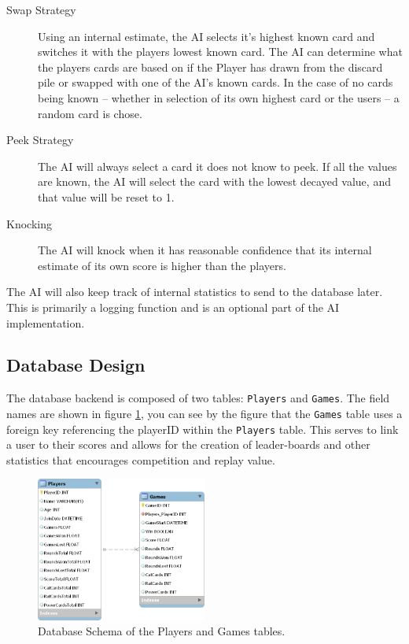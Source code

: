 \documentclass[12pt]{IEEEtran}
\begin{document}
	\begin{description}
		\item[Swap Strategy] \hspace{3em} Using an internal estimate, the AI selects it's highest known card and 						switches it with the players lowest known card. The AI can determine what the players cards are based on 				if the Player has drawn from the discard pile or swapped with one of the AI's known cards. In the case of 					no cards being known -- whether in selection of its own highest card or the users -- a random card is 					chose. 
		\item[Peek Strategy] \hspace{3em} The AI will always select a card it does not know to peek. If all the values are 			known, the AI will select the card with the lowest decayed value, and that value will be reset to 1.
		\item[Knocking] \hspace{3em}  The AI will knock when it has reasonable confidence that its internal estimate of its 			own score is higher than the players.
	\end{description}

	The AI will also keep track of internal statistics to send to the database later. This is primarily a logging function and is an 	optional part of the AI implementation.

\subsection{Database Design}
\label{subsec:dbdesign}

	The database backend is composed of two tables: \texttt{Players} and \texttt{Games}. The field names are shown in 			figure \ref{fig:dbschema}, you can see by the figure that the \texttt{Games} table uses a foreign key referencing the 			playerID within the \texttt{Players} table. This serves to link a user to their scores and allows for the creation of 				leader-boards and other statistics that encourages competition and replay value.
	
	\begin{figure}[ht]
		\includegraphics[width=0.5\textwidth]{DatabaseDiagram.png}
		\caption[Database table design]{ Database Schema of the Players and Games tables.}
		\label{fig:dbschema}
	\end{figure}
\end{document}
